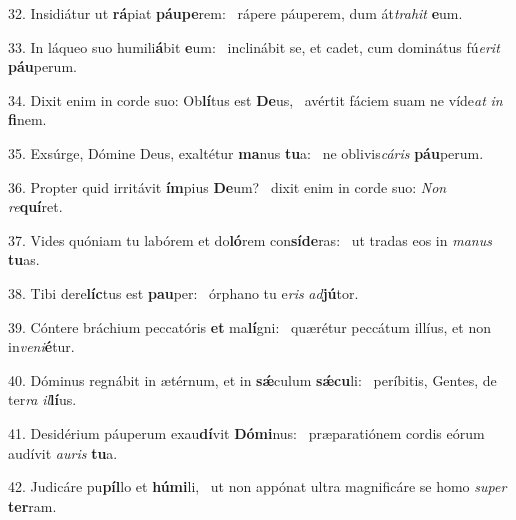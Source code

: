 32. Insidiátur ut \textbf{rá}piat \textbf{páu}\textbf{pe}rem: \ast\  rápere páuperem, dum át\textit{tra}\textit{hit} \textbf{e}um.\

33. In láqueo suo humili\textbf{á}bit \textbf{e}um: \ast\  inclinábit se, et cadet, cum dominátus fú\textit{e}\textit{rit} \textbf{páu}perum.\

34. Dixit enim in corde suo: Ob\textbf{lí}tus est \textbf{De}us, \ast\  avértit fáciem suam ne víde\textit{at} \textit{in} \textbf{fi}nem.\

35. Exsúrge, Dómine Deus, exaltétur \textbf{ma}nus \textbf{tu}a: \ast\  ne oblivis\textit{cá}\textit{ris} \textbf{páu}perum.\

36. Propter quid irritávit \textbf{ím}pius \textbf{De}um? \ast\  dixit enim in corde suo: \textit{Non} \textit{re}\textbf{quí}ret.\

37. Vides quóniam tu labórem et do\textbf{ló}rem con\textbf{sí}\textbf{de}ras: \ast\  ut tradas eos in \textit{ma}\textit{nus} \textbf{tu}as.\

38. Tibi dere\textbf{líc}tus est \textbf{pau}per: \ast\  órphano tu e\textit{ris} \textit{ad}\textbf{jú}tor.\

39. Cóntere bráchium peccatóris \textbf{et} ma\textbf{lí}gni: \ast\  quærétur peccátum illíus, et non in\textit{ve}\textit{ni}\textbf{é}tur.\

40. Dóminus regnábit in ætérnum, et in \textbf{sǽ}culum \textbf{sǽ}\textbf{cu}li: \ast\  períbitis, Gentes, de ter\textit{ra} \textit{il}\textbf{lí}us.\

41. Desidérium páuperum exau\textbf{dí}vit \textbf{Dó}\textbf{mi}nus: \ast\  præparatiónem cordis eórum audívit \textit{au}\textit{ris} \textbf{tu}a.\

42. Judicáre pu\textbf{píl}lo et \textbf{hú}\textbf{mi}li, \ast\  ut non appónat ultra magnificáre se homo \textit{su}\textit{per} \textbf{ter}ram.\

